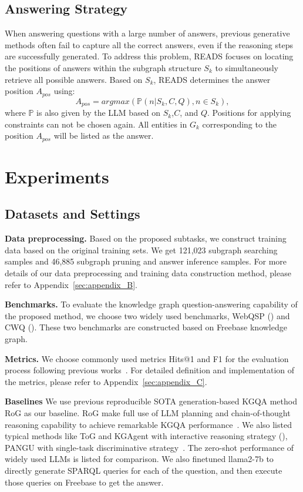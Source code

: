 \documentclass[11pt]{article}
\begin{document}
\subsection{Answering Strategy}

When answering questions with a large number of answers, previous generative methods often fail to capture all the correct answers, even if the reasoning steps are successfully generated. To address this problem, READS focuses on locating the positions of answers within the subgraph structure $S_k$ to simultaneously retrieve all possible answers. Based on $S_{k}$, READS determines the answer position $A_{pos}$ using:
\begin{equation}
    A_{pos} = argmax(\mathbb{P}(n|S_k,C,Q),n\in S_k),
\end{equation}
where $\mathbb{P}$ is also given by the LLM based on $S_k$,$C$, and $Q$. Positions for applying constraints can not be chosen again. All entities in $G_k$ corresponding to the position $A_{pos}$ will be listed as the answer. 

\section{Experiments}
\label{sec:result}

\subsection{Datasets and Settings}

\textbf{Data preprocessing.} Based on the proposed subtasks, we construct training data based on the original training sets. We get 121,023 subgraph searching samples and 46,885 subgraph pruning and answer inference samples. For more details of our data preprocessing and training data construction method, please refer to Appendix~\ref{sec:appendix_B}.

\noindent\textbf{Benchmarks.} To evaluate the knowledge graph question-answering capability of the proposed method, we choose two widely used benchmarks, WebQSP (\citealp{webqsp}) and CWQ (\citealp{cwq}). These two benchmarks are constructed based on Freebase knowledge graph.

\noindent\textbf{Metrics.} We choose commonly used metrics Hits@1 and F1 for the evaluation process following previous works~\cite{rog,ToG}. For detailed definition and implementation of the metrics, please refer to Appendix~\ref{sec:appendix_C}. 


\noindent\textbf{Baselines} We use previous reproducible SOTA generation-based KGQA method RoG as our baseline. RoG make full use of LLM planning and chain-of-thought reasoning capability to achieve remarkable KGQA performance~\cite{rog}. We also listed typical methods like ToG and KGAgent with interactive reasoning strategy (\citealp{ToG,jiang2024kg}), PANGU with single-task discriminative strategy~\cite{gu2023don}. The zero-shot performance of widely used LLMs is listed for comparison. We also finetuned llama2-7b to directly generate SPARQL queries for each of the question, and then execute those queries on Freebase to get the answer. 
\end{document}
